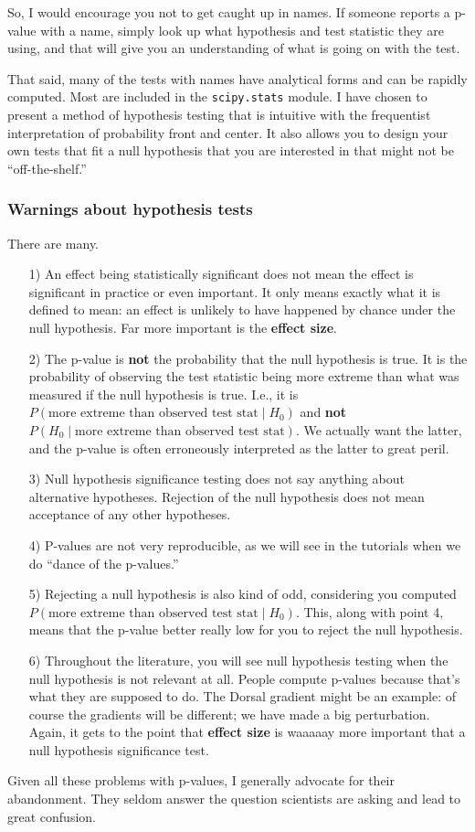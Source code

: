 So, I would encourage you not to get caught up in names.  If someone reports a p-value with a name, simply look up what hypothesis and test statistic they are using, and that will give you an understanding of what is going on with the test.

That said, many of the tests with names have analytical forms and can be rapidly computed.  Most are included in the \texttt{scipy.stats} module.  I have chosen to present a method of hypothesis testing that is intuitive with the frequentist interpretation of probability front and center.  It also allows you to design your own tests that fit a null hypothesis that you are interested in that might not be ``off-the-shelf.''

\subsubsection{Warnings about hypothesis tests}
There are many.
\begin{itemize}
\item[1)] An effect being statistically significant does not mean the effect is significant in practice or even important.  It only means exactly what it is defined to mean: an effect is unlikely to have happened by chance under the null hypothesis.  Far more important is the \textbf{effect size}.
\item[2)] The p-value is \textbf{not} the probability that the null hypothesis is true.  It is the probability of observing the test statistic being more extreme than what was measured if the null hypothesis is true.  I.e., it is  $P(\text{more extreme than observed test stat}\mid H_0)$ and \textbf{not} $P(H_0\mid \text{more extreme than observed test stat})$.  We actually want the latter, and the p-value is often erroneously interpreted as the latter to great peril.
\item[3)] Null hypothesis significance testing does not say anything about alternative hypotheses.  Rejection of the null hypothesis does not mean acceptance of any other hypotheses.
\item[4)] P-values are not very reproducible, as we will see in the tutorials when we do ``dance of the p-values.''
\item[5)] Rejecting a null hypothesis is also kind of odd, considering you computed $P(\text{more extreme  than observed test stat}\mid H_0)$.  This, along with point 4, means that the p-value better really low for you to reject the null hypothesis.
\item[6)] Throughout the literature, you will see null hypothesis testing when the null hypothesis is not relevant at all.  People compute p-values because that's what they are supposed to do.  The Dorsal gradient might be an example: of course the gradients will be different; we have made a big perturbation.  Again, it gets to the point that \textbf{effect size} is waaaaay more important that a null hypothesis significance test.
\end{itemize}

Given all these problems with p-values, I generally advocate for their abandonment.  They seldom answer the question scientists are asking and lead to great confusion.

